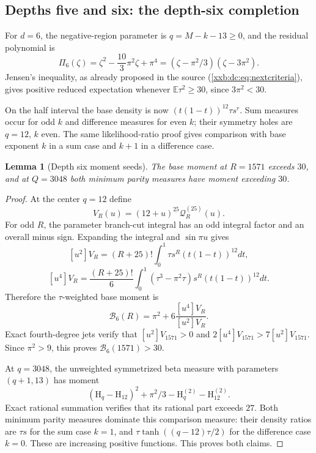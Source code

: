 \documentclass[11pt,a4paper]{article}
\numberwithin{equation}{section}
\newtheorem{lemma}[theorem]{Lemma}
\theoremstyle{definition}
\theoremstyle{remark}
\theoremstyle{plain}
\newcommand{\fall}[2]{#1^{\underline{#2}}}
\begin{document}
\subsection{Depths five and six: the depth-six completion}\label{xxb:d56:sec:six}

For $d=6$, the negative-region parameter is $q=M-k-13\ge0$, and the residual
polynomial is
\[
 \Pi_6(\zeta)=\zeta^2-\frac{10}{3}\pi^2\zeta+\pi^4
 =(\zeta-\pi^2/3)(\zeta-3\pi^2).
\]
Jensen's inequality, as already proposed in the source
(\eqref{xxb:dc:eq:nextcriteria}), gives positive reduced expectation whenever
$\mathbb E\tau^2\ge30$, since $3\pi^2<30$.

On the half interval the base density is now $(t(1-t))^{12}\tau s^r$. Sum
measures occur for odd $k$ and difference measures for even $k$; their symmetry
holes are $q=12$, $k$ even. The same likelihood-ratio proof gives comparison
with base exponent $k$ in a sum case and $k+1$ in a difference case.

\begin{lemma}[Depth six moment seeds]\label{xxb:d56:lem:seeds6}
The base moment at $R=1571$ exceeds $30$, and at $Q=3048$ both minimum parity
measures have moment exceeding $30$.
\end{lemma}
\begin{proof}
At the center $q=12$ define
\[
 V_R(u)=\fall{(12+u)}{25}\mathcal Q_R^{(25)}(u).
\]
For odd $R$, the parameter branch-cut integral has an odd integral factor and
an overall minus sign. Expanding the integral and $\sin\pi u$ gives
\[
 [u^2]V_R=(R+25)!\int_0^1\tau s^R(t(1-t))^{12}dt,
\]
\[
 [u^4]V_R=\frac{(R+25)!}{6}\int_0^1
 (\tau^3-\pi^2\tau)s^R(t(1-t))^{12}dt.
\]
Therefore the $\tau$-weighted base moment is
\[
 \mathcal B_6(R)=\pi^2+6\frac{[u^4]V_R}{[u^2]V_R}.
\]
Exact fourth-degree jets verify that $[u^2]V_{1571}>0$ and
$2[u^4]V_{1571}>7[u^2]V_{1571}$. Since $\pi^2>9$, this proves
$\mathcal B_6(1571)>30$.

At $q=3048$, the unweighted symmetrized beta measure with parameters
$(q+1,13)$ has moment
\[
 (\mathrm H_q-\mathrm H_{12})^2+\pi^2/3
 -\mathrm H_q^{(2)}-\mathrm H_{12}^{(2)}.
\]
Exact rational summation verifies that its rational part exceeds $27$. Both
minimum parity measures dominate this comparison measure: their density ratios
are $\tau s$ for the sum case $k=1$, and $\tau\tanh((q-12)\tau/2)$ for the
difference case $k=0$. These are increasing positive functions. This proves
both claims.
\end{proof}
\end{document}
